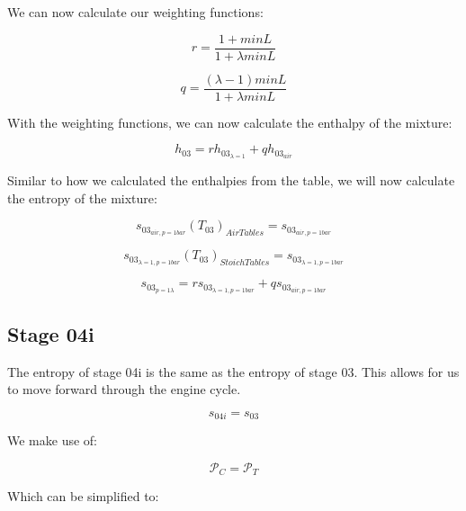 \documentclass[titlepage]{article}
\begin{document}
    We can now calculate our weighting functions:

    \begin{equation}
        r = \frac{1 + minL}{1 + \lambda minL}
    \end{equation}

    \begin{equation}
        q = \frac{(\lambda -1)minL}{1+\lambda minL}
    \end{equation}

    With the weighting functions, we can now calculate the enthalpy of the mixture:

    \begin{equation}
        h_{03} = r h_{03_{\lambda=1}} + q h_{03_{air}}
    \end{equation}

    Similar to how we calculated the enthalpies from the table, we will now calculate the entropy of the mixture:

    \begin{equation}
        s_{03_{air, p= 1 bar}}(T_{03})_{Air Tables} = s_{03_{air, p=1 bar}}
    \end{equation} 

    \begin{equation}
        s_{03_{\lambda=1, p= 1 bar}}(T_{03})_{Stoich  Tables} = s_{03_{\lambda=1, p = 1 bar}}
    \end{equation}

    \begin{equation}
        s_{03_{p=1 \lambda}} = r s_{03_{\lambda=1, p=1 bar}} + q s_{03_{air, p=1 bar}}
    \end{equation}

    \subsection{Stage 04i}
    The entropy of stage 04i is the same as the entropy of stage 03. This allows for us to move forward through the engine cycle.

    \begin{equation}
        s_{04i} = s_{03}
    \end{equation}

    We make use of:

    \begin{equation}
        \mathcal{P}_{C} = \mathcal{P}_{T} 
    \end{equation}

    Which can be simplified to:
\end{document}
